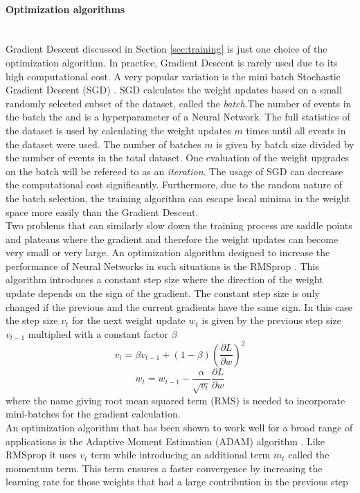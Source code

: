 \paragraph{Optimization algorithms} \mbox{} \\
Gradient Descent discussed in Section \ref{sec:training} is just one choice of the optimization algorithm. In practice, Gradient Descent is rarely used due to its high computational cost. A very popular variation is the mini batch Stochastic Gradient Descent (SGD) \cite{MainNN}. SGD calculates the weight updates based on a small randomly selected subset of the dataset, called the \textit{batch}.The number of events in the batch the   and is a hyperparameter of a Neural Network. The full statistics of the dataset is used by calculating the weight updates $m$ times until all events in the dataset were used. The number of batches $m$ is given by batch size divided by the number of events in the total dataset. One evaluation of the weight upgrades on the batch will be refereed to as an \textit{iteration}. The usage of SGD can decrease the computational cost significantly. Furthermore, due to the random nature of the batch selection, the training algorithm can escape local minima in the weight space more easily than the Gradient Descent. \\
Two problems that can similarly slow down the training process are saddle points and plateaus where the gradient and therefore the weight updates can become very small or very large. An optimization algorithm designed to increase the performance of Neural Networks in such situations is the RMSprop \cite{Opti}. This algorithm introduces a constant step size where the direction of the weight update depends on the sign of the gradient. The constant step size is only changed if the previous and the current gradients have the same sign. In this case the step size $v_t$ for the next weight update $w_t$ is given by the previous step size $v_{t-1}$ multiplied with a constant factor $\beta$
\begin{equation}
v_t = \beta v_{t-1}+(1-\beta)(\frac{\partial L}{\partial w})^2
\end{equation}
\begin{equation}
w_t = w_{t-1}-\frac{\alpha}{\sqrt{v_t}} \frac{\partial L}{\partial w}
\end{equation}
where the name giving root mean squared term (RMS) is needed to incorporate mini-batches for the gradient calculation. \\
An optimization algorithm that has been shown to work well for a broad range of applications is the Adaptive Moment Estimation (ADAM) algorithm \cite{Opti}. Like RMSprop it uses $v_t$ term while introducing an additional term $m_t$ called the momentum term. This term ensures a faster convergence by increasing the learning rate for those weights that had a large contribution in the previous step
